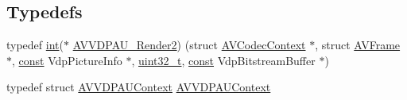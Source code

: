 \subsection*{Typedefs}
\begin{DoxyCompactItemize}
\item 
typedef \hyperlink{xmltok_8h_a5a0d4a5641ce434f1d23533f2b2e6653}{int}($\ast$ \hyperlink{group__lavc__codec__hwaccel__vdpau_ga1f243045ef2673ebe2a50a8431f3dfa7}{A\+V\+V\+D\+P\+A\+U\+\_\+\+Render2}) (struct \hyperlink{struct_a_v_codec_context}{A\+V\+Codec\+Context} $\ast$, struct \hyperlink{struct_a_v_frame}{A\+V\+Frame} $\ast$, \hyperlink{getopt1_8c_a2c212835823e3c54a8ab6d95c652660e}{const} Vdp\+Picture\+Info $\ast$, \hyperlink{lib-src_2ffmpeg_2win32_2stdint_8h_a6eb1e68cc391dd753bc8ce896dbb8315}{uint32\+\_\+t}, \hyperlink{getopt1_8c_a2c212835823e3c54a8ab6d95c652660e}{const} Vdp\+Bitstream\+Buffer $\ast$)
\item 
typedef struct \hyperlink{struct_a_v_v_d_p_a_u_context}{A\+V\+V\+D\+P\+A\+U\+Context} \hyperlink{group__lavc__codec__hwaccel__vdpau_ga3baa98869e246d5047601b76858ad281}{A\+V\+V\+D\+P\+A\+U\+Context}
\end{DoxyCompactItemize}
